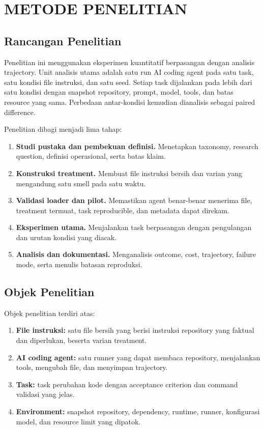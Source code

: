 \chapter{METODE PENELITIAN}

\section{Rancangan Penelitian}

Penelitian ini menggunakan eksperimen kuantitatif berpasangan dengan analisis trajectory. Unit analisis utama adalah satu run AI coding agent pada satu task, satu kondisi file instruksi, dan satu seed. Setiap task dijalankan pada lebih dari satu kondisi dengan snapshot repository, prompt, model, tools, dan batas resource yang sama. Perbedaan antar-kondisi kemudian dianalisis sebagai paired difference.

Penelitian dibagi menjadi lima tahap:

\begin{enumerate}[leftmargin=*]
    \item \textbf{Studi pustaka dan pembekuan definisi.} Menetapkan taxonomy, research question, definisi operasional, serta batas klaim.
    \item \textbf{Konstruksi treatment.} Membuat file instruksi bersih dan varian yang mengandung satu smell pada satu waktu.
    \item \textbf{Validasi loader dan pilot.} Memastikan agent benar-benar menerima file, treatment termuat, task reproducible, dan metadata dapat direkam.
    \item \textbf{Eksperimen utama.} Menjalankan task berpasangan dengan pengulangan dan urutan kondisi yang diacak.
    \item \textbf{Analisis dan dokumentasi.} Menganalisis outcome, cost, trajectory, failure mode, serta menulis batasan reproduksi.
\end{enumerate}

\section{Objek Penelitian}

Objek penelitian terdiri atas:

\begin{enumerate}[leftmargin=*]
    \item \textbf{File instruksi:} satu file bersih yang berisi instruksi repository yang faktual dan diperlukan, beserta varian treatment.
    \item \textbf{AI coding agent:} satu runner yang dapat membaca repository, menjalankan tools, mengubah file, dan menyimpan trajectory.
    \item \textbf{Task:} task perubahan kode dengan acceptance criterion dan command validasi yang jelas.
    \item \textbf{Environment:} snapshot repository, dependency, runtime, runner, konfigurasi model, dan resource limit yang dipatok.
\end{enumerate}


